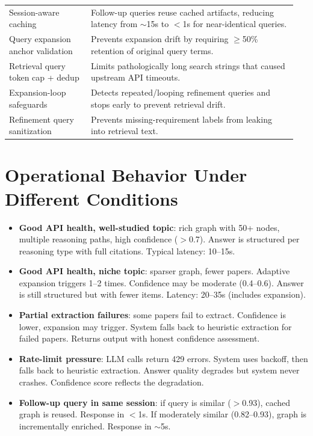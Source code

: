 \documentclass[11pt]{article}
\begin{document}
\begin{longtable}{p{0.27\linewidth}p{0.68\linewidth}}
Session-aware caching & Follow-up queries reuse cached artifacts, reducing latency from $\sim$15s to $<$1s for near-identical queries. \\
Query expansion anchor validation & Prevents expansion drift by requiring $\geq$50\% retention of original query terms. \\
Retrieval query token cap + dedup & Limits pathologically long search strings that caused upstream API timeouts. \\
Expansion-loop safeguards & Detects repeated/looping refinement queries and stops early to prevent retrieval drift. \\
Refinement query sanitization & Prevents missing-requirement labels from leaking into retrieval text. \\
\bottomrule
\end{longtable}

\section{Operational Behavior Under Different Conditions}

\begin{itemize}[leftmargin=1.2em]
  \item \textbf{Good API health, well-studied topic}: rich graph with 50+ nodes, multiple reasoning paths, high confidence ($>$0.7). Answer is structured per reasoning type with full citations. Typical latency: 10--15s.

  \item \textbf{Good API health, niche topic}: sparser graph, fewer papers. Adaptive expansion triggers 1--2 times. Confidence may be moderate (0.4--0.6). Answer is still structured but with fewer items. Latency: 20--35s (includes expansion).

  \item \textbf{Partial extraction failures}: some papers fail to extract. Confidence is lower, expansion may trigger. System falls back to heuristic extraction for failed papers. Returns output with honest confidence assessment.

  \item \textbf{Rate-limit pressure}: LLM calls return 429 errors. System uses backoff, then falls back to heuristic extraction. Answer quality degrades but system never crashes. Confidence score reflects the degradation.

  \item \textbf{Follow-up query in same session}: if query is similar ($>$0.93), cached graph is reused. Response in $<$1s. If moderately similar (0.82--0.93), graph is incrementally enriched. Response in $\sim$5s.
\end{itemize}
\end{document}
